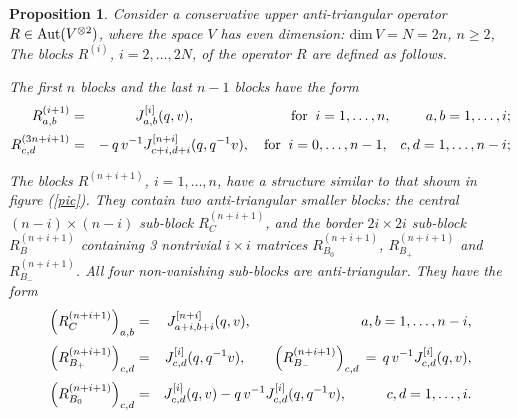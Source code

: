 \documentclass[11pt]{article}
\def\ba{\begin{eqnarray}}\def\ea{\end{eqnarray}}
\newcounter{theorem}\def\thetheorem{\thesection.\arabic{theorem}}\makeatletter
\newtheorem{prop}[theorem]{Proposition}
\begin{document}
\begin{prop}
		Consider a conservative upper anti-triangular operator 
	$R\in {\rm Aut}(V^{\otimes 2})$, where the space $V$ has even dimension: $\mbox{dim}\, V =N= 2n$, $n\geq 2$, The blocks $R^{(i)}$,  $i=2,\dots ,2N$, of the operator $R$ are defined as follows.
	
	The first $n$ blocks and the last $n-1$ blocks have the form
	\ba
	\lb{C1}
	R^{(i+1)}_{a,b} &=& J^{[i]}_{a,b}(q,v), \qquad\qquad\;\qquad\;\;\mbox{for}\;\; i=1,\dots ,n, \qquad\;\, a,b=1,\dots ,i;
	\\[2pt]
	\lb{C2}
	R^{(3n+i+1)}_{c,d} &=& -\,{q\, v^{-1}} J^{[n+i]}_{c+i,d+i}(q,{q^{-1}v}), \quad\mbox{for}\;\; i=0,\dots ,n-1, \;\;\; c,d=1,\dots ,n-i;
	\ea
	
	The blocks  $R^{(n+i+1)}$, $i=1,\dots ,n$,  have a structure similar to that shown in  figure (\ref{pic}). They contain two anti-triangular smaller blocks:
	the central $(n-i)\times (n-i)$ sub-block $R_{C}^{(n+i+1)}$, and the border $2i\times 2i$ sub-block $R_{B}^{(n+i+1)}$ 
	containing 3 nontrivial $i\times i$ matrices
	$R_{B_0}^{(n+i+1)}$, $R_{B_+}^{(n+i+1)}$ and $R_{B_-}^{(n+i+1)}$.
	All four non-vanishing sub-blocks are anti-triangular. They have the form
	\ba
	\lb{C3}
	\left(R_{C}^{(n+i+1)}\right)_{a,b} &=& J^{[n+i]}_{a+i,b+i}(q,v), \qquad \qquad \qquad \quad\;\;\; a,b=1,\dots , n-i,
	\\[2pt]
	\lb{C4}
	\left(R_{B_+}^{(n+i+1)}\right)_{c,d} &=& J^{[i]}_{c,d}(q,q^{-1}v), \qquad
	\left(R_{B_-}^{(n+i+1)}\right)_{c,d} \,=\, q\,v^{-1} J^{[i]}_{c,d}(q,v),
	\\[2pt]
	\lb{C6}
	\left(R_{B_0}^{(n+i+1)}\right)_{c,d} &=&  J^{[i]}_{c,d}(q,v) -  q\,v^{-1} J^{[i]}_{c,d}(q,q^{-1}v),\qquad\;\;\;  c,d= 1,\dots , i.
	\ea
	

\end{prop}
\end{document}
